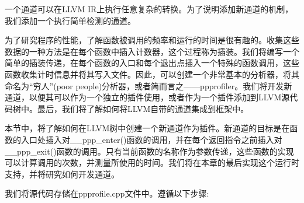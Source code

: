
一个通道可以在LLVM IR上执行任意复杂的转换。为了说明添加新通道的机制，我们添加一个执行简单检测的通道。

为了研究程序的性能，了解函数被调用的频率和运行的时间是很有趣的。收集这些数据的一种方法是在每个函数中插入计数器，这个过程称为插装。我们将编写一个简单的插装传递，在每个函数的入口和每个退出点插入一个特殊的函数调用，这些函数收集计时信息并将其写入文件。因此，可以创建一个非常基本的分析器，将其命名为“穷人”(poor people)分析器，或者简而言之——ppprofiler。我们将开发新通道，以便其可以作为一个独立的插件使用，或者作为一个插件添加到LLVM源代码树中。最后，我们将了解如何将LLVM自带的通道集成到框架中。


本节中，将了解如何在LLVM树中创建一个新通道作为插件。新通道的目标是在函数的入口处插入对\_\_ppp\_enter()函数的调用，并在每个返回指令之前插入对\_\_ppp\_exit()函数的调用。只有当前函数的名称作为参数传递，这些函数的实现可以计算调用的次数，并测量所使用的时间。我们将在本章的最后实现这个运行时支持，并将研究如何开发通道。

我们将源代码存储在ppprofile.cpp文件中。遵循以下步骤:


